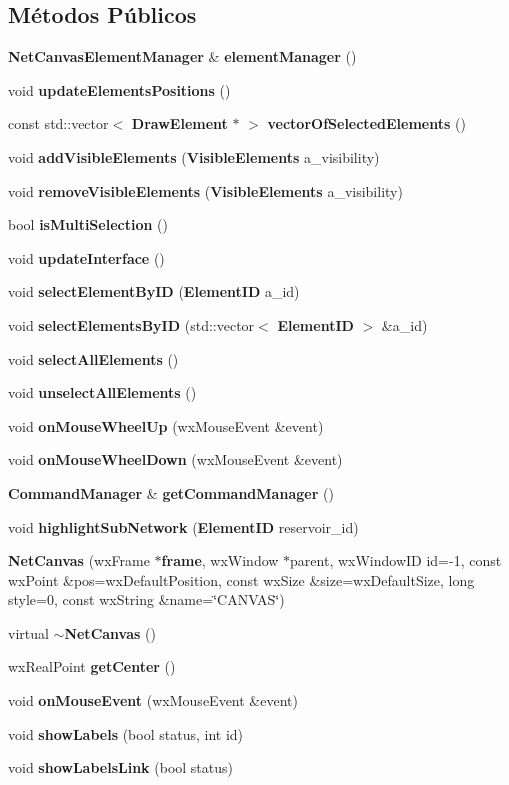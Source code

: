 \subsection*{Métodos Públicos}
\begin{DoxyCompactItemize}
\item 
{\bf Net\+Canvas\+Element\+Manager} \& {\bf element\+Manager} ()
\item 
void {\bf update\+Elements\+Positions} ()
\item 
const std\+::vector$<$ {\bf Draw\+Element} $\ast$ $>$ {\bf vector\+Of\+Selected\+Elements} ()
\item 
void {\bf add\+Visible\+Elements} ({\bf Visible\+Elements} a\+\_\+visibility)
\item 
void {\bf remove\+Visible\+Elements} ({\bf Visible\+Elements} a\+\_\+visibility)
\item 
bool {\bf is\+Multi\+Selection} ()
\item 
void {\bf update\+Interface} ()
\item 
void {\bf select\+Element\+By\+ID} ({\bf Element\+ID} a\+\_\+id)
\item 
void {\bf select\+Elements\+By\+ID} (std\+::vector$<$ {\bf Element\+ID} $>$ \&a\+\_\+id)
\item 
void {\bf select\+All\+Elements} ()
\item 
void {\bf unselect\+All\+Elements} ()
\item 
void {\bf on\+Mouse\+Wheel\+Up} (wx\+Mouse\+Event \&event)
\item 
void {\bf on\+Mouse\+Wheel\+Down} (wx\+Mouse\+Event \&event)
\item 
{\bf Command\+Manager} \& {\bf get\+Command\+Manager} ()
\item 
void {\bf highlight\+Sub\+Network} ({\bf Element\+ID} reservoir\+\_\+id)
\item 
{\bf Net\+Canvas} (wx\+Frame $\ast${\bf frame}, wx\+Window $\ast$parent, wx\+Window\+ID id=-\/1, const wx\+Point \&pos=wx\+Default\+Position, const wx\+Size \&size=wx\+Default\+Size, long style=0, const wx\+String \&name=\char`\"{}C\+A\+N\+V\+AS\char`\"{})
\item 
virtual {\bf $\sim$\+Net\+Canvas} ()
\item 
wx\+Real\+Point {\bf get\+Center} ()
\item 
void {\bf on\+Mouse\+Event} (wx\+Mouse\+Event \&event)
\item 
void {\bf show\+Labels} (bool status, int id)
\item 
void {\bf show\+Labels\+Link} (bool status)

\end{DoxyCompactItemize}

